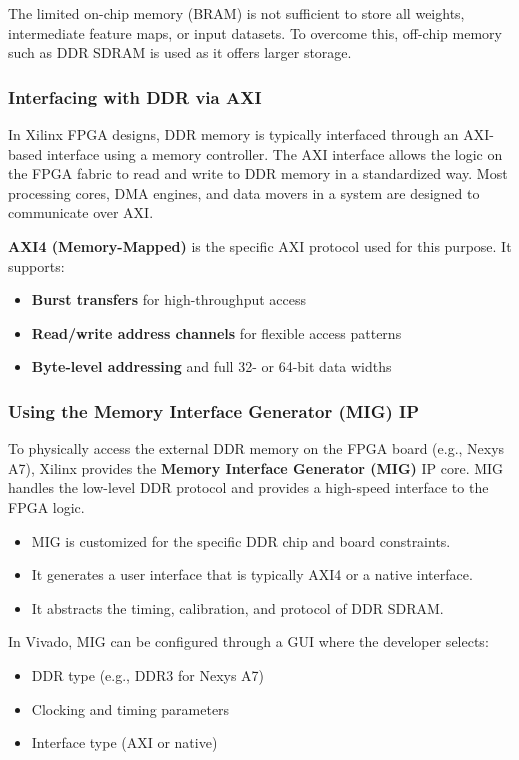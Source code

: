 \documentclass{article}
\begin{document}
The limited on-chip memory (BRAM) is not sufficient to store all weights, intermediate feature maps, or input datasets. To overcome this, off-chip memory such as DDR SDRAM is used as it offers larger storage.

\subsubsection*{Interfacing with DDR via AXI}

In Xilinx FPGA designs, DDR memory is typically interfaced through an AXI-based interface using a memory controller. The AXI interface allows the logic on the FPGA fabric to read and write to DDR memory in a standardized way. Most processing cores, DMA engines, and data movers in a system are designed to communicate over AXI.

\textbf{AXI4 (Memory-Mapped)} is the specific AXI protocol used for this purpose. It supports:
\begin{itemize}
  \item \textbf{Burst transfers} for high-throughput access
  \item \textbf{Read/write address channels} for flexible access patterns
  \item \textbf{Byte-level addressing} and full 32- or 64-bit data widths
\end{itemize}

\subsubsection*{Using the Memory Interface Generator (MIG) IP}

To physically access the external DDR memory on the FPGA board (e.g., Nexys A7), Xilinx provides the \textbf{Memory Interface Generator (MIG)} IP core. MIG handles the low-level DDR protocol and provides a high-speed interface to the FPGA logic.

\begin{itemize}
  \item MIG is customized for the specific DDR chip and board constraints.
  \item It generates a user interface that is typically AXI4 or a native interface.
  \item It abstracts the timing, calibration, and protocol of DDR SDRAM.
\end{itemize}

In Vivado, MIG can be configured through a GUI where the developer selects:
\begin{itemize}
  \item DDR type (e.g., DDR3 for Nexys A7)
  \item Clocking and timing parameters
  \item Interface type (AXI or native)
\end{itemize}
\end{document}

